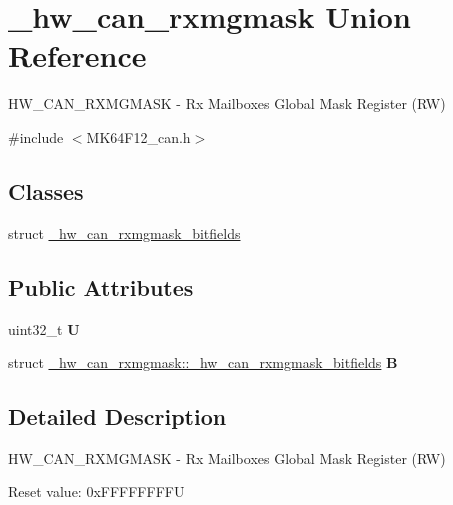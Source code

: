 \hypertarget{union__hw__can__rxmgmask}{}\section{\+\_\+hw\+\_\+can\+\_\+rxmgmask Union Reference}
\label{union__hw__can__rxmgmask}


H\+W\+\_\+\+C\+A\+N\+\_\+\+R\+X\+M\+G\+M\+A\+SK -\/ Rx Mailboxes Global Mask Register (RW)  




{\ttfamily \#include $<$M\+K64\+F12\+\_\+can.\+h$>$}

\subsection*{Classes}
\begin{DoxyCompactItemize}
\item 
struct \hyperlink{struct__hw__can__rxmgmask_1_1__hw__can__rxmgmask__bitfields}{\+\_\+hw\+\_\+can\+\_\+rxmgmask\+\_\+bitfields}
\end{DoxyCompactItemize}
\subsection*{Public Attributes}
\begin{DoxyCompactItemize}
\item 
uint32\+\_\+t {\bfseries U}\hypertarget{union__hw__can__rxmgmask_a4c4fa94eee9c1a48a9bb4e76fc2cc6d5}{}\label{union__hw__can__rxmgmask_a4c4fa94eee9c1a48a9bb4e76fc2cc6d5}

\item 
struct \hyperlink{struct__hw__can__rxmgmask_1_1__hw__can__rxmgmask__bitfields}{\+\_\+hw\+\_\+can\+\_\+rxmgmask\+::\+\_\+hw\+\_\+can\+\_\+rxmgmask\+\_\+bitfields} {\bfseries B}\hypertarget{union__hw__can__rxmgmask_a21da5bf0963eb7e25e3f39b35fa6d44c}{}\label{union__hw__can__rxmgmask_a21da5bf0963eb7e25e3f39b35fa6d44c}

\end{DoxyCompactItemize}


\subsection{Detailed Description}
H\+W\+\_\+\+C\+A\+N\+\_\+\+R\+X\+M\+G\+M\+A\+SK -\/ Rx Mailboxes Global Mask Register (RW) 

Reset value\+: 0x\+F\+F\+F\+F\+F\+F\+F\+FU

